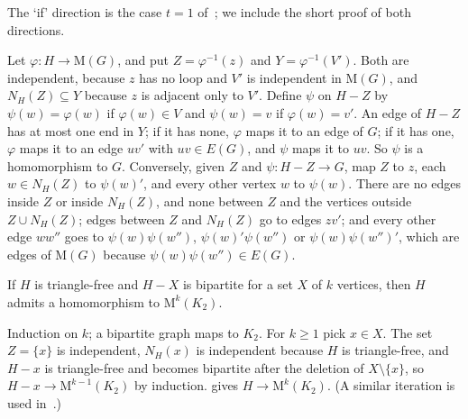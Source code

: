 The `if' direction is the case $t=1$ of~\cite[Lemma~2.3]{GHW2025}; we include the short proof of both directions.

\begin{informalproof}
Let $\varphi\colon H\to\mathrm M(G)$, and put $Z=\varphi^{-1}(z)$ and $Y=\varphi^{-1}(V')$. Both are independent,
because $z$ has no loop and $V'$ is independent in $\mathrm M(G)$, and $N_H(Z)\subseteq Y$ because $z$ is adjacent only
to $V'$. Define $\psi$ on $H-Z$ by $\psi(w)=\varphi(w)$ if $\varphi(w)\in V$ and $\psi(w)=v$ if $\varphi(w)=v'$. An edge
of $H-Z$ has at most one end in $Y$; if it has none, $\varphi$ maps it to an edge of $G$; if it has one, $\varphi$ maps it
to an edge $uv'$ with $uv\in E(G)$, and $\psi$ maps it to $uv$. So $\psi$ is a homomorphism to $G$. Conversely, given
$Z$ and $\psi\colon H-Z\to G$, map $Z$ to $z$, each $w\in N_H(Z)$ to $\psi(w)'$, and every other vertex $w$ to $\psi(w)$.
There are no edges inside $Z$ or inside $N_H(Z)$, and none between $Z$ and the vertices outside $Z\cup N_H(Z)$; edges
between $Z$ and $N_H(Z)$ go to edges $zv'$; and every other edge $ww''$ goes to $\psi(w)\psi(w'')$, $\psi(w)'\psi(w'')$ or
$\psi(w)\psi(w'')'$, which are edges of $\mathrm M(G)$ because $\psi(w)\psi(w'')\in E(G)$.
\end{informalproof}

\begin{corollary}\label{cor:ana-oct}
\notformalized
If $H$ is triangle-free and $H-X$ is bipartite for a set $X$ of $k$ vertices, then $H$ admits a homomorphism to
$\mathrm M^k(K_2)$.
\end{corollary}

\begin{informalproof}
Induction on $k$; a bipartite graph maps to $K_2$. For $k\ge1$ pick $x\in X$. The set $Z=\{x\}$ is independent, $N_H(x)$
is independent because $H$ is triangle-free, and $H-x$ is triangle-free and becomes bipartite after the deletion of
$X\setminus\{x\}$, so $H-x\to\mathrm M^{k-1}(K_2)$ by induction.  gives $H\to\mathrm M^k(K_2)$. (A
similar iteration is used in~\cite{GHW2025}.)
\end{informalproof}

